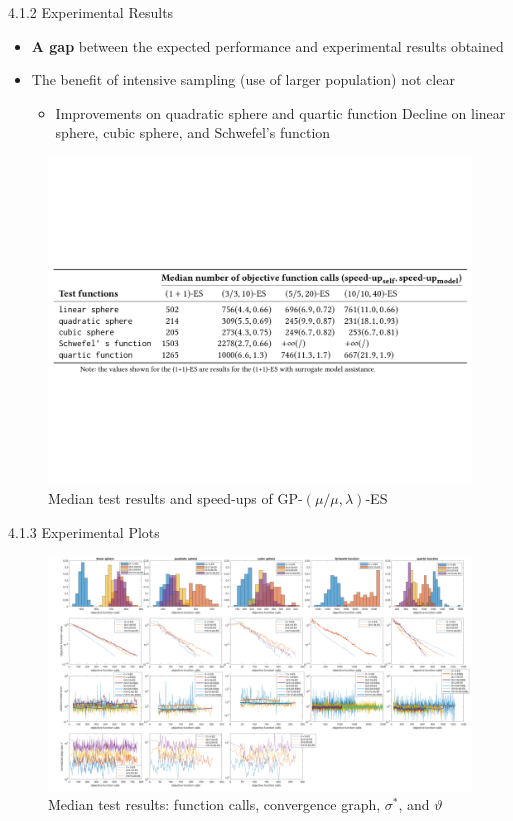 \documentclass{beamer}
\begin{document}
\begin{frame}{4.1.2 Experimental Results}

\begin{itemize}
    \item \textbf{A gap} between the expected performance and experimental results obtained 
    \item The benefit of intensive sampling (use of larger population) not clear
        \begin{itemize}
            \item Improvements on quadratic sphere and quartic function
            \itme Decline on linear sphere, cubic sphere, and Schwefel's function
        \end{itemize}
\end{itemize}

\begin{figure}
\includegraphics[width=1.0\linewidth]{tab-GP-mml-ES.pdf}
    \caption{Median test results and speed-ups of GP-$(\mu/\mu,\lambda)$-ES}
\end{figure}


\end{frame}

\begin{frame}{4.1.3 Experimental Plots }
\begin{figure}
\includegraphics[width=1.0\linewidth]{merged_plot_NO_emergency_v4_final.pdf}
    \caption{Median test results: function calls, convergence graph, $\sigma^*$, and $\vartheta$}
\end{figure}
\end{frame}
\end{document}
